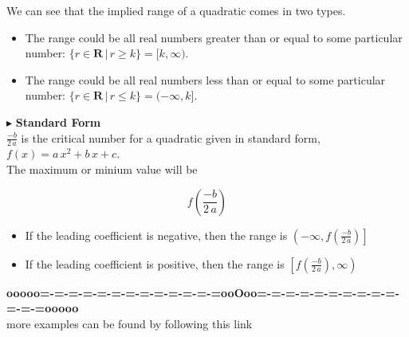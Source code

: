 \documentclass{ximera}
\begin{document}
We can see that the implied range of a quadratic comes in two types.  

\begin{itemize}
\item The range could be all real numbers greater than or equal to some particular number:  $\{ r \in \textbf{R} \, | \, r \geq k \} = [k, \infty)$.
\item The range could be all real numbers less than or equal to some particular number:  $\{ r \in \textbf{R} \, | \, r \leq k \} = (-\infty, k]$.
\end{itemize}






$\blacktriangleright$  \textbf{Standard Form} \\

$\frac{-b}{2 \, a}$ is the critical number for a quadratic given in standard form, $f(x) = a \, x^2 + b \, x + c$. \\

The maximum or minium value will be 

\[
f\left( \frac{-b}{2 \, a} \right)
\]

\begin{itemize}
     \item If the leading coefficient is negative, then the range is $\left(-\infty, f\left( \frac{-b}{2 \, a} \right)\right]$ \\
     \item If the leading coefficient is positive, then the range is $\left[f\left( \frac{-b}{2 \, a} \right), \infty \right)$ \\
\end{itemize}





\begin{center}
\textbf{\textcolor{green!50!black}{ooooo=-=-=-=-=-=-=-=-=-=-=-=-=ooOoo=-=-=-=-=-=-=-=-=-=-=-=-=ooooo}} \\

more examples can be found by following this link\\ 

\end{center}
\end{document}
